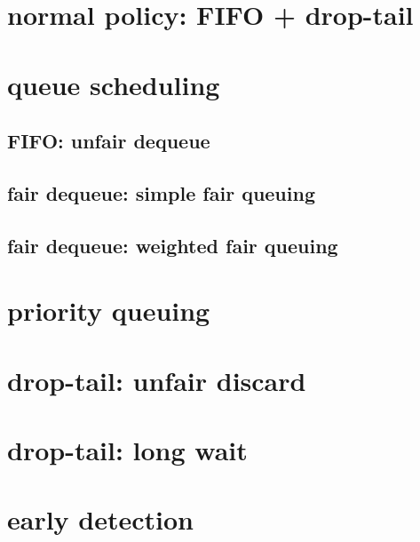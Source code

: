 \section{normal policy: FIFO + drop-tail}


\section{queue scheduling}


\subsection{FIFO: unfair dequeue} 


\subsection{fair dequeue: simple fair queuing}




\subsection{fair dequeue: weighted fair queuing}



\section{priority queuing}


\section{drop-tail: unfair discard}


\section{drop-tail: long wait}


\section{early detection}

